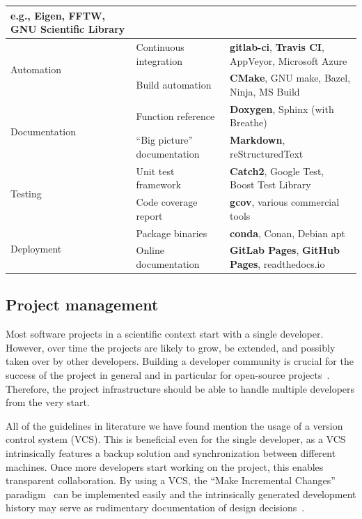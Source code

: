 \documentclass[@CLASSOPTIONS@]{tumarticle}
\begin{document}
\begin{table}
\begin{tabular}{lll}
    e.g., Eigen, FFTW, GNU Scientific Library
    \\
    \hline
    \multirow{2}{*}{Automation}         & Continuous integration        &
    \textbf{gitlab-ci}, \textbf{Travis CI}, AppVeyor, Microsoft Azure
    \\
    \cline{2-3}
                                        & Build automation              &
    \textbf{CMake}, GNU make, Bazel, Ninja, MS Build
    \\
    \hline
    \multirow{2}{*}{Documentation}      & Function reference            &
    \textbf{Doxygen}, Sphinx (with Breathe)
    \\
    \cline{2-3}
                                        & ``Big picture'' documentation &
    \textbf{Markdown}, reStructuredText
    \\
    \hline
    \multirow{2}{*}{Testing}            & Unit test framework           &
    \textbf{Catch2}, Google Test, Boost Test Library
    \\
    \cline{2-3}
                                        & Code coverage report          &
    \textbf{gcov}, various commercial tools
    \\
    \hline
    \multirow{2}{*}{Deployment}         & Package binaries              &
    \textbf{conda}, Conan, Debian apt
    \\
    \cline{2-3}
                                        & Online documentation          &
    \textbf{GitLab Pages}, \textbf{GitHub Pages}, readthedocs.io
    \\
    \hline
  \end{tabular}
\end{table}

\subsection{Project management}

Most software projects in a scientific context start with a single developer.
However, over time the projects are likely to grow, be extended, and possibly
taken over by other developers. Building a developer community is crucial for
the success of the project in general and in particular for open-source
projects~\cite{bangerth2013}. Therefore, the project infrastructure should be
able to handle multiple developers from the very start.

All of the guidelines in literature we have found mention the usage of a
version control system (VCS). This is beneficial even for the single
developer, as a VCS intrinsically features a backup solution and
synchronization between different machines. Once more developers start
working on the project, this enables transparent collaboration. By using a
VCS, the ``Make Incremental Changes'' paradigm~\cite{wilson2014, wilson2017}
can be implemented easily and the intrinsically generated development history
may serve as rudimentary documentation of design
decisions~\cite{bangerth2013}.
\end{document}
